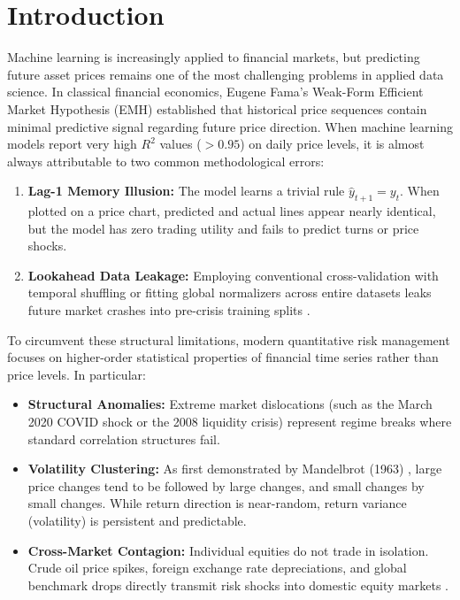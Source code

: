 \documentclass[10pt,twocolumn,letterpaper]{article}
\begin{document}
\section{Introduction}
Machine learning is increasingly applied to financial markets, but predicting future asset prices remains one of the most challenging problems in applied data science. In classical financial economics, Eugene Fama's Weak-Form Efficient Market Hypothesis (EMH) \cite{fama1970} established that historical price sequences contain minimal predictive signal regarding future price direction. When machine learning models report very high $R^2$ values ($> 0.95$) on daily price levels, it is almost always attributable to two common methodological errors:
\begin{enumerate}[leftmargin=*]
    \item \textbf{Lag-1 Memory Illusion:} The model learns a trivial rule $\hat{y}_{t+1} = y_t$. When plotted on a price chart, predicted and actual lines appear nearly identical, but the model has zero trading utility and fails to predict turns or price shocks.
    \item \textbf{Lookahead Data Leakage:} Employing conventional cross-validation with temporal shuffling or fitting global normalizers across entire datasets leaks future market crashes into pre-crisis training splits \cite{lopez2018advances}.
\end{enumerate}

To circumvent these structural limitations, modern quantitative risk management focuses on higher-order statistical properties of financial time series rather than price levels. In particular:
\begin{itemize}[leftmargin=*]
    \item \textbf{Structural Anomalies:} Extreme market dislocations (such as the March 2020 COVID shock or the 2008 liquidity crisis) represent regime breaks where standard correlation structures fail.
    \item \textbf{Volatility Clustering:} As first demonstrated by Mandelbrot (1963) \cite{mandelbrot1963}, large price changes tend to be followed by large changes, and small changes by small changes. While return direction is near-random, return variance (volatility) is persistent and predictable.
    \item \textbf{Cross-Market Contagion:} Individual equities do not trade in isolation. Crude oil price spikes, foreign exchange rate depreciations, and global benchmark drops directly transmit risk shocks into domestic equity markets \cite{diebold2014}.
\end{itemize}
\end{document}
